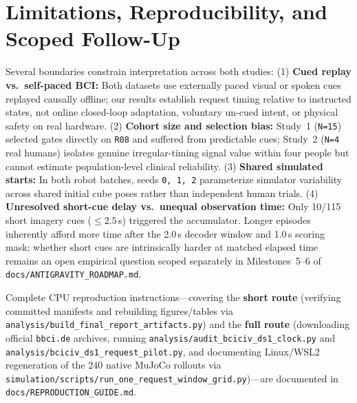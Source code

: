 \documentclass{article}
\begin{document}
\section{Limitations, Reproducibility, and Scoped Follow-Up}
\label{sec:limits}

Several boundaries constrain interpretation across both studies:
(1) \textbf{Cued replay vs.\ self-paced BCI:} Both datasets use externally paced visual or spoken cues replayed causally offline; our results establish request timing relative to instructed states, not online closed-loop adaptation, voluntary un-cued intent, or physical safety on real hardware.
(2) \textbf{Cohort size and selection bias:} Study~1 (\texttt{N=15}) selected gates directly on \texttt{R08} and suffered from predictable cues; Study~2 (\texttt{N=4} real humans) isolates genuine irregular-timing signal value within four people but cannot estimate population-level clinical reliability.
(3) \textbf{Shared simulated starts:} In both robot batches, seeds \texttt{0, 1, 2} parameterize simulator variability across shared initial cube poses rather than independent human trials.
(4) \textbf{Unresolved short-cue delay vs.\ unequal observation time:} Only 10/115 short imagery cues ($\le 2.5$\,s) triggered the accumulator. Longer episodes inherently afford more time after the 2.0\,s decoder window and 1.0\,s scoring mask; whether short cues are intrinsically harder at matched elapsed time remains an open empirical question scoped separately in Milestones~5--6 of \texttt{docs/\allowbreak ANTIGRAVITY\_ROADMAP.md}.

Complete CPU reproduction instructions---covering the \textbf{short route} (verifying committed manifests and rebuilding figures/tables via \texttt{analysis/\allowbreak build\_final\_report\_artifacts.py}) and the \textbf{full route} (downloading official \texttt{bbci.de} archives, running \texttt{analysis/\allowbreak audit\_bciciv\_ds1\_clock.py} and \texttt{analysis/\allowbreak bciciv\_ds1\_request\_pilot.py}, and documenting Linux/WSL2 regeneration of the 240 native MuJoCo rollouts via \texttt{simulation/\allowbreak scripts/\allowbreak run\_one\_request\_window\_grid.py})---are documented in \texttt{docs/\allowbreak REPRODUCTION\_GUIDE.md}.



\end{document}
